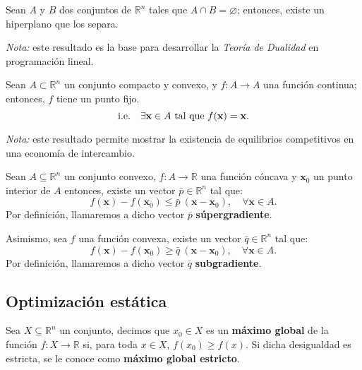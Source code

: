 \documentclass[8pt,a4paper]{extarticle}
\begin{document}
\begin{multicols}{3}
	\begin{boxtheo}[Minkowski]
		Sean $A$ y $B$ dos conjuntos de $\mathbb{R}^n$ tales que $A \cap B = \varnothing$; entonces, existe un hiperplano que los separa.
	\end{boxtheo}

	\emph{Nota:} este resultado es la base para desarrollar la \emph{Teoría de Dualidad} en programación lineal.

	\begin{boxtheo}
		Sean $A \subset \mathbb{R}^n$ un conjunto compacto y convexo, y $f : A \to A$ una función continua; entonces, $f$ tiene un punto fijo.
		\[
			\text{\normalfont i.e.} \quad \exists \mathbf{x} \in A \text{ tal que } f(\mathbf{x}) = \mathbf{x}.
		\]
	\end{boxtheo}
	
	\emph{Nota:} este resultado permite mostrar la existencia de equilibrios competitivos en una economía de intercambio.

	\begin{boxtheo}
		Sean $A \subseteq \mathbb{R}^n$ un conjunto convexo, $f : A \to \mathbb{R}$ una función cóncava y $\mathbf{x}_0$ un punto interior de $A$ entonces, existe un vector $\bar{p} \in \mathbb{R}^n$ tal que:
		\[f(\mathbf{x}) - f(\mathbf{x}_0) \leq \bar{p}\ (\mathbf{x} - \mathbf{x}_0), \quad \forall \mathbf{x} \in A.\]
		Por definición, llamaremos a dicho vector $\bar{p}$ \textbf{súpergradiente}. \par
		Asimismo, sea $f$ una función convexa, existe un vector $\bar{q} \in \mathbb{R}^n$ tal que:
		\[f(\mathbf{x}) - f(\mathbf{x}_0) \geq \bar{q}\ (\mathbf{x} - \mathbf{x}_0), \quad \forall \mathbf{x} \in A.\]
		Por definición, llamaremos a dicho vector $\bar{q}$ \textbf{subgradiente}.
	\end{boxtheo}

	\newpage
	
	\subsection{Optimización estática}

	\begin{boxdef}
		Sea $X \subseteq \mathbb{R}^{n}$ un conjunto, decimos que $x_0 \in X$ es un \textbf{máximo global} de la función $f : X \to \mathbb{R}$ si, para toda $x \in X$, $f(x_0) \geq f(x)$. Si dicha desigualdad es estricta, se le conoce como \textbf{máximo global estricto}.
	\end{boxdef}


\end{multicols}
\end{document}
